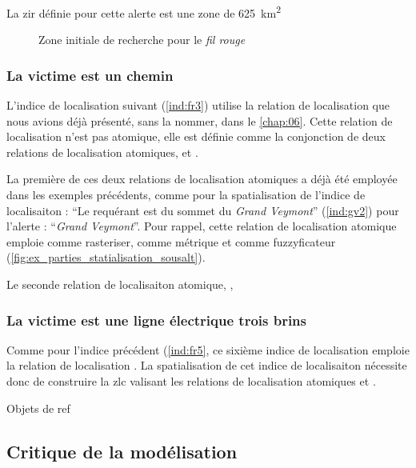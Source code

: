 La \ac{zir} définie pour cette alerte est une zone de
\SI{625}{\kilo\meter\squared}

\begin{figure}
  \centering
  
  \caption{Zone initiale de recherche pour le \emph{fil rouge}}
  \label{fig:zir_fil_rouge}
\end{figure}

\subsubsection{La victime est \protect{} un chemin}

L'indice de localisation suivant (\ref{ind:fr3}) utilise la relation
de localisation  que nous avions déjà
présenté, sans la nommer, dans le \autoref{chap:06}. Cette relation de
localisation n'est pas atomique, elle est définie comme la conjonction
de deux relations de localisation atomiques,
 et .

La première de ces deux relations de localisation atomiques
 a déjà été employée dans les exemples
précédents, comme pour la spatialisation de l'indice de localisaiton :
\enquote{Le requérant est  du sommet du
  \emph{Grand Veymont}} (\ref{ind:gv2}) pour l'alerte :
\enquote{\emph{Grand Veymont}}. Pour rappel, cette relation de
localisation atomique emploie  comme rasteriser,
 comme métrique et
 comme fuzzyficateur
(\autoref{fig:ex_parties_statialisation_sousalt}).

Le seconde relation de localisaiton atomique, ,


\subsubsection{La victime est \protect{} une ligne
  électrique trois brins}

Comme pour l'indice précédent (\ref{ind:fr5}, ce sixième indice de
localisation emploie la relation de localisation
.
%
La spatialisation de cet indice de localisaiton nécessite donc de
construire la \ac{zlc} valisant les relations de localisation
atomiques  et .

Objets de ref

\subsection{Critique de la modélisation}
\label{subsec:9-4-3}

